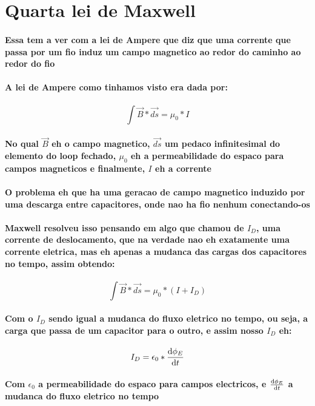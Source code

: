 \documentclass[12pt,twoside, a4paper, twocolumn]{article}
\begin{document}
\section{Quarta lei de Maxwell}
\paragraph*{Essa tem a ver com a lei de Ampere que diz que uma corrente que passa por um fio induz um campo magnetico ao redor do caminho ao redor do fio }
\paragraph*{A lei de Ampere como tinhamos visto era dada por:}
\begin{equation}
    \int \vec{B} * \vec{ds} = \mu_0 * I
\end{equation}
\paragraph*{No qual $\vec{B}$ eh o campo magnetico, $\vec{ds}$ um pedaco infinitesimal do elemento do loop fechado, $\mu_0$ eh a permeabilidade do espaco para campos magneticos e finalmente, $I$ eh a corrente}
\paragraph*{O problema eh que ha uma geracao de campo magnetico induzido por uma descarga entre capacitores, onde nao ha fio nenhum conectando-os}
\paragraph*{Maxwell resolveu isso pensando em algo que chamou de $I_D$, uma corrente de deslocamento, que na verdade nao eh exatamente uma corrente eletrica, mas eh apenas a mudanca das cargas dos capacitores no tempo, assim obtendo:}
\begin{equation}
    \int \vec{B} * \vec{ds} = \mu_0 * \left(I +I_D\right)
\end{equation}
\paragraph*{Com o $I_D$ sendo igual a mudanca do fluxo eletrico no tempo, ou seja, a carga que passa de um capacitor para o outro, e assim nosso $I_D$ eh:}
\begin{equation}
    I_D = \epsilon_0 * \frac{\mathrm d \phi_E}{\mathrm d t}
\end{equation}
\paragraph*{Com $\epsilon_0$ a permeabilidade do espaco para campos electricos, e $\frac{\mathrm d \phi_E}{\mathrm d t}$ a mudanca do fluxo eletrico no tempo}
\end{document}

